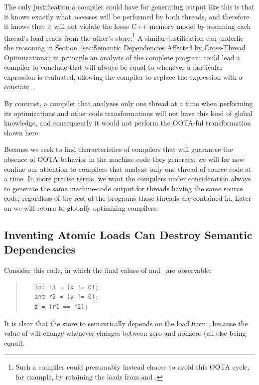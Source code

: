 \documentclass[10]{article}
\begin{document}
The only justification a compiler could have for generating output like
this is that it knows exactly what accesses will be performed by both
threads, and therefore it knows that it will not violate the loose C++
memory model by assuming each thread's load reads from the other's
store.\footnote{
	Such a compiler could presumably instead choose to avoid this
	OOTA cycle, for example, by retaining the loads from 
	and .}
A similar justification can underlie the reasoning in
Section~\ref{sec:Semantic Dependencies Affected by Cross-Thread Optimizations};
in principle an analysis of the complete program could lead a compiler
to conclude that  will always be equal to  whenever a
particular  expression is evaluated, allowing the compiler
to replace the expression with a constant .

By contrast, a compiler that analyzes only one thread at a time when
performing its optimizations and other code transformations will not
have this kind of global knowledge, and consequently it would not
perform the OOTA-ful transformation shown here.

Because we seek to find characteristics of compilers that will
guarantee the absence of OOTA behavior in the machine code they generate,
we will for now confine our attention to compilers that analyze only
one thread of source code at a time.
In more precise terms, we want the compilers under consideration
always to generate the same machine-code output for threads having
the same source code, regardless of the rest of the programs
those threads are contained in.
Later on we will return to globally optimizing compilers.

\subsection{Inventing Atomic Loads Can Destroy Semantic Dependencies}
\label{sec:Inventing Atomic Loads Can Destroy Semantic Dependencies}

Consider this code, in which the final values of  and~
are observable:
\begin{quote}
\begin{verbatim}
   int r1 = (x != 0);
   int r2 = (y != 0);
   z = (r1 == r2);
\end{verbatim}
\end{quote}
It is clear that the store to  semantically depends on the load
from , because the value of  will change whenever 
changes between zero and nonzero (all else being equal).
\end{document}
